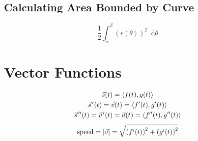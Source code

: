 \documentclass[12pt]{article}
\DeclarePairedDelimiter\abs{\lvert}{\rvert}
\newcommand*{\D}[1]{\mathop{}\!\mathrm{d}#1}
\newcommand{\pvec}[1]{\vec{#1}\mkern2mu\vphantom{#1}}
\newcommand*{\fixmath}{%
  \makebox{}\vspace{\glueexpr-\baselineskip-\abovedisplayskip}}
\newenvironment{fixaskip}{\setlength{\abovedisplayskip}{0pt}\fixmath%
  \ignorespaces}{\ignorespacesafterend}
\newenvironment{fixskip}{\setlength{\abovedisplayskip}{0pt}%
  \setlength{\belowdisplayskip}{0pt}\fixmath\ignorespaces}%
  {\ignorespacesafterend}
\begin{document}
\subsection*{Calculating Area Bounded by Curve}
\begin{fixskip}
  \[
    \frac{1}{2} \int_\alpha^\beta {(r(\theta))}^2 \D{\theta}
  \]
\end{fixskip}
\section*{Vector Functions}
\begin{fixaskip}
  \begin{gather*}
    \vec{s}(t) = \left<f(t),g(t)\right>\\
    \pvec{s}'(t) = \vec{v}(t) = \left<f'(t),g'(t)\right>\\
    \pvec{s}''(t) = \pvec{v}'(t) = \vec{a}(t) = \left<f''(t),g''(t)\right>
  \end{gather*}
\end{fixaskip}
\[
  \text{speed} = \abs{\vec{v}} = \sqrt{{(f'(t))}^2 + {(g'(t))}^2}
\]
\end{document}
